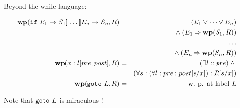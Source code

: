 Beyond the while-language:

\begin{eqnarray*}
    \wp(\ifC E_1 \enblC S_1 \altC \dots \altC E_n \enblC S_n,R)
    &=& (E_1 \lor \dots \lor E_n) 
\\  & & {} \land (E_1 \implies \wp(S_1,R))
\\  & & \dots
\\  & & {} \land (E_n \implies \wp(S_n,R))
\\ \wp(x:l[pre,post],R)
   &=&
   (\exists l :: pre) \land {}
\\ && (\forall s : (\forall l : pre : post[s/x]) : R[s/x] )
\\ \wp(\gotoC L,R) &=& \text{w. p. at label } L
\end{eqnarray*}

Note that $\mathtt{goto\ } L$ is miraculous !